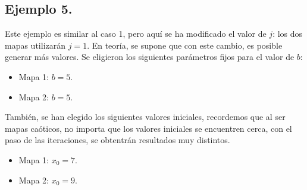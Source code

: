 \documentclass[10pt]{IEEEtran}
\begin{document}
\subsection{Ejemplo 5.}
Este ejemplo es similar al caso 1, pero aquí se ha modificado el valor de $j$: los dos mapas utilizarán $j=1$. En teoría, se supone que con este cambio, es posible generar más valores. Se eligieron los siguientes parámetros fijos para el valor de $b$:

\begin{itemize}
\item Mapa 1: $b =  5$.
\item Mapa 2: $b =  5$.
\end{itemize}

También, se han elegido los siguientes valores iniciales, recordemos que al ser mapas caóticos, no importa que los valores iniciales se encuentren cerca, con el paso de las iteraciones, se obtentrán resultados muy distintos.

\begin{itemize}
\item Mapa 1: $x_{0} = 7$.
\item Mapa 2: $x_{0} = 9$.
\end{itemize}
\end{document}
